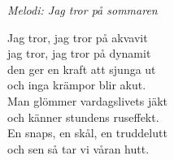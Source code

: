 {\footnotesize\textit{Melodi: Jag tror på sommaren}}\par
\vspace{10pt}
Jag tror, jag tror på akvavit\\
jag tror, jag tror på dynamit\\
den ger en kraft att sjunga ut\\
och inga krämpor blir akut.\\
Man glömmer vardagslivets jäkt\\
och känner stundens ruseffekt.\\
En snaps, en skål, en truddelutt\\
och sen så tar vi våran hutt.
